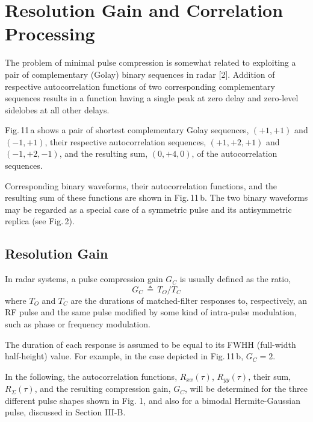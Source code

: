 \documentclass[journal]{IEEEtran}
\begin{document}
\section{Resolution Gain and Correlation Processing} 
The problem of minimal pulse compression is somewhat related to exploiting a pair of   complementary (Golay) binary sequences in radar [2]. Addition of respective autocorrelation functions of two corresponding complementary sequences results in a function having a single peak at zero delay and zero-level sidelobes at all other delays.

Fig.\,11\,a shows a pair of shortest complementary Golay sequences, 
$(+1,+1)$ and $(-1,+1)$, their respective autocorrelation sequences, $(+1,+2,+1)$ and $(-1,+2,-1)$, and the resulting sum, $(0,+4,0)$, of the autocorrelation sequences.

Corresponding binary waveforms, their autocorrelation functions, and the resulting sum of these functions are shown in Fig.\,11\,b. The two binary waveforms may be regarded as a special case of a symmetric pulse and its antisymmetric replica (see Fig.\,2). 

\subsection{Resolution Gain} 
In radar systems, a pulse compression gain $G_C$ is usually defined as the ratio, 
\begin{equation}
G_C \, \triangleq\,  T_O/T_C	
\end{equation}
where $T_O$ and $T_C$ are the durations of matched-filter responses to, respectively, an RF pulse and the same pulse modified by some kind of intra-pulse modulation, such as phase or frequency modulation. 

The duration of each response is assumed to be equal to its FWHH (full-width half-height) value. For example, in the case depicted in Fig.\,11\,b, $G_C=2$.


In the following, the autocorrelation functions, $R_{xx}(\tau)$, $R_{yy}(\tau)$, their sum, $R_\Sigma(\tau)$, and the resulting compression gain, $G_C$, will be determined for the three different pulse shapes shown in Fig. 1, and also for a bimodal Hermite-Gaussian pulse, discussed in Section III-B.

\vspace{0.1cm}
\end{document}
